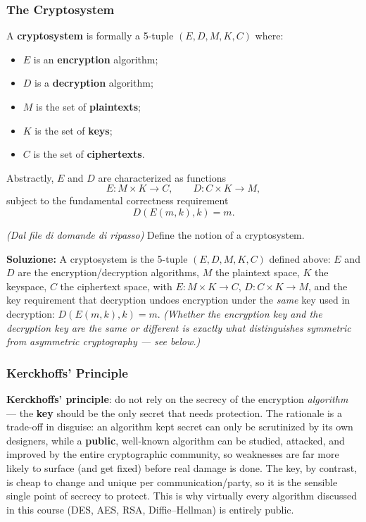 \documentclass[12pt, a4paper]{article}
\newcounter{esercizio}[section]
\begin{document}
\subsubsection{The Cryptosystem}
\label{subsec:cryptosystem-04}
A \textbf{cryptosystem} is formally a 5-tuple $(E, D, M, K, C)$ where:
\begin{itemize}
    \item $E$ is an \textbf{encryption} algorithm;
    \item $D$ is a \textbf{decryption} algorithm;
    \item $M$ is the set of \textbf{plaintexts};
    \item $K$ is the set of \textbf{keys};
    \item $C$ is the set of \textbf{ciphertexts}.
\end{itemize}
Abstractly, $E$ and $D$ are characterized as functions
\[
E : M \times K \to C, \qquad D : C \times K \to M,
\]
subject to the fundamental correctness requirement
\[
D(E(m,k),k) = m.
\]

\begin{tcolorbox}[colback=lightergray!10, colframe=tocsec, title=\textbf{Esercizio \theesercizio}]
\textit{(Dal file di domande di ripasso)} Define the notion of a cryptosystem.
\end{tcolorbox}

\textbf{Soluzione:} A cryptosystem is the 5-tuple $(E,D,M,K,C)$ defined above: $E$ and $D$ are the encryption/decryption algorithms, $M$ the plaintext space, $K$ the keyspace, $C$ the ciphertext space, with $E:M\times K\to C$, $D:C\times K \to M$, and the key requirement that decryption undoes encryption under the \emph{same} key used in decryption: $D(E(m,k),k)=m$. \emph{(Whether the encryption key and the decryption key are the same or different is exactly what distinguishes symmetric from asymmetric cryptography — see below.)}

\subsubsection{Kerckhoffs' Principle}
\label{subsec:kerckhoffs-04}
\textcolor{red!70!black}{\textbf{Kerckhoffs' principle}}: do not rely on the secrecy of the encryption \emph{algorithm} — the \textbf{key} should be the only secret that needs protection. The rationale is a trade-off in disguise: an algorithm kept secret can only be scrutinized by its own designers, while a \textbf{public}, well-known algorithm can be studied, attacked, and improved by the entire cryptographic community, so weaknesses are far more likely to surface (and get fixed) before real damage is done. The key, by contrast, is cheap to change and unique per communication/party, so it is the sensible single point of secrecy to protect. This is why virtually every algorithm discussed in this course (DES, AES, RSA, Diffie--Hellman) is entirely public.
\end{document}
